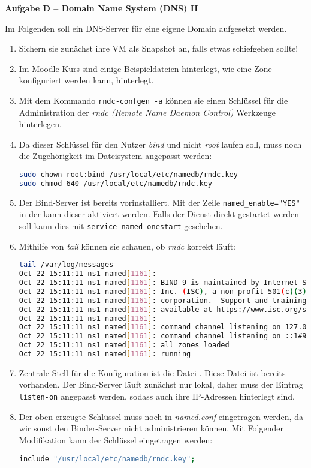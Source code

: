 \documentclass[paper=a4,fontsize=11pt]{scrartcl}%
\numberwithin{equation}{section}
\begin{document}
\begin{center}\Large{\textbf{Aufgabe D -- Domain Name System (DNS) II}}\end{center}\vskip0.25in
Im Folgenden soll ein DNS-Server für eine eigene Domain aufgesetzt werden.
\begin{enumerate}
	\item Sichern sie zunächst ihre VM als Snapshot an, falls etwas schiefgehen sollte!
	\item Im Moodle-Kurs sind einige Beispieldateien hinterlegt, wie eine Zone konfiguriert werden kann, hinterlegt. 
	\item Mit dem Kommando \texttt{rndc-confgen -a} können sie einen Schlüssel für die Administration der \emph{rndc (Remote Name Daemon Control)} Werkzeuge hinterlegen.
	\item Da dieser Schlüssel für den Nutzer \emph{bind} und nicht \emph{root} laufen soll, muss noch die Zugehörigkeit im Dateisystem angepasst werden:
	\begin{lstlisting}[style=Bash, language=Bash]
sudo chown root:bind /usr/local/etc/namedb/rndc.key
sudo chmod 640 /usr/local/etc/namedb/rndc.key
\end{lstlisting}
	\item Der Bind-Server ist bereits vorinstalliert. Mit der Zeile \texttt{named\_enable="YES"} in der  kann dieser aktiviert werden. Falls der Dienst direkt gestartet werden soll kann dies mit \texttt{service named onestart} geschehen.
	\item Mithilfe von \emph{tail} können sie schauen, ob \emph{rndc} korrekt läuft:
			\begin{lstlisting}[style=Bash, language=Bash]
tail /var/log/messages
Oct 22 15:11:11 ns1 named[1161]: ------------------------------
Oct 22 15:11:11 ns1 named[1161]: BIND 9 is maintained by Internet Systems Consortium,
Oct 22 15:11:11 ns1 named[1161]: Inc. (ISC), a non-profit 501(c)(3) public-benefit
Oct 22 15:11:11 ns1 named[1161]: corporation.  Support and training for BIND 9 are
Oct 22 15:11:11 ns1 named[1161]: available at https://www.isc.org/support
Oct 22 15:11:11 ns1 named[1161]: ------------------------------
Oct 22 15:11:11 ns1 named[1161]: command channel listening on 127.0.0.1#953
Oct 22 15:11:11 ns1 named[1161]: command channel listening on ::1#953
Oct 22 15:11:11 ns1 named[1161]: all zones loaded
Oct 22 15:11:11 ns1 named[1161]: running
		\end{lstlisting}
		\item Zentrale Stell für die Konfiguration ist die Datei . Diese Datei ist bereits vorhanden. Der Bind-Server läuft zunächst nur lokal, daher muss der Eintrag \texttt{listen-on} angepasst werden, sodass auch ihre IP-Adressen hinterlegt sind.
		\item Der oben erzeugte Schlüssel  muss noch in \emph{named.conf} eingetragen werden, da wir sonst den Binder-Server nicht administrieren können. Mit Folgender Modifikation kann der Schlüssel eingetragen werden:
		\begin{lstlisting}[style=Bash, language=Bash]
include "/usr/local/etc/namedb/rndc.key";
 

\end{lstlisting}
\end{enumerate}
\end{document}
